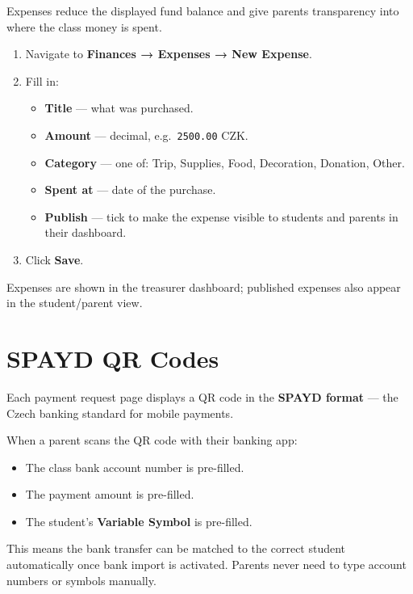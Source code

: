 \documentclass[a4paper,11pt]{article}
\begin{document}
Expenses reduce the displayed fund balance and give parents transparency
into where the class money is spent.

\begin{enumerate}[noitemsep]
    \item Navigate to \textbf{Finances → Expenses → New Expense}.
    \item Fill in:
        \begin{itemize}[noitemsep]
            \item \textbf{Title} — what was purchased.
            \item \textbf{Amount} — decimal, e.g.\ \texttt{2500.00} CZK.
            \item \textbf{Category} — one of:
                  Trip, Supplies, Food, Decoration, Donation, Other.
            \item \textbf{Spent at} — date of the purchase.
            \item \textbf{Publish} — tick to make the expense visible
                  to students and parents in their dashboard.
        \end{itemize}
    \item Click \textbf{Save}.
\end{enumerate}

\noindent
Expenses are shown in the treasurer dashboard; published expenses also
appear in the student/parent view.

\section{SPAYD QR Codes}
\label{sec:qr}

Each payment request page displays a QR code in the
\textbf{SPAYD format} — the Czech banking standard for mobile payments.

When a parent scans the QR code with their banking app:
\begin{itemize}[noitemsep]
    \item The class bank account number is pre-filled.
    \item The payment amount is pre-filled.
    \item The student's \textbf{Variable Symbol} is pre-filled.
\end{itemize}

\noindent
This means the bank transfer can be matched to the correct student
automatically once bank import is activated.
Parents never need to type account numbers or symbols manually.
\end{document}
